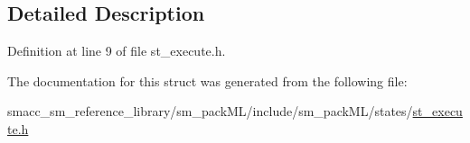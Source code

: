 \subsection{Detailed Description}


Definition at line 9 of file st\+\_\+execute.\+h.



The documentation for this struct was generated from the following file\+:\begin{DoxyCompactItemize}
\item 
smacc\+\_\+sm\+\_\+reference\+\_\+library/sm\+\_\+pack\+M\+L/include/sm\+\_\+pack\+M\+L/states/\hyperlink{st__execute_8h}{st\+\_\+execute.\+h}\end{DoxyCompactItemize}
